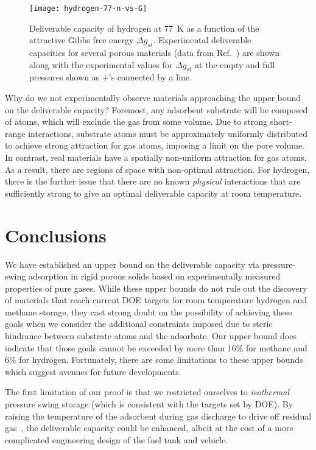 \documentclass[twoside,twocolumn,9pt]{article}
\newcommand\gst{\ensuremath{\Delta g_{st}}}
\begin{document}
\begin{figure}
    \centering
    \texttt{[image: hydrogen-77-n-vs-G]}
    \caption{Deliverable capacity of hydrogen at 77\ K as a function of the attractive Gibbs free energy $\gst$. Experimental deliverable capacities for several porous materials (data from Ref.~\cite{garcia2018benchmark}) are shown along with the experimental values for $\gst$ at the empty and full pressures shown as $+$'s connected by a line.}
    \label{fig:hydrogen-77-D}
\end{figure}

Why do we not experimentally observe materials approaching the upper bound on
the deliverable capacity? Foremost, any adsorbent substrate will be composed of
atoms, which will exclude the gas from some volume. Due to strong short-range
interactions, substrate atoms must be approximately uniformly distributed to achieve strong
attraction for gas atoms, imposing a limit on the pore
volume. In contrast, real materials have a spatially non-uniform attraction for
gas atoms. As a result, there are regions of space with
non-optimal attraction. For hydrogen, there is the further issue that there are
no known \emph{physical} interactions that are sufficiently strong to give an
optimal deliverable capacity at room temperature.

\section{Conclusions}
We have established an upper bound on the deliverable capacity via
pressure-swing adsorption in rigid porous solids based on experimentally
measured properties of pure gases. While these upper bounds do not rule out the
discovery of materials that reach current DOE targets for room temperature hydrogen and methane storage, they cast strong doubt
on the possibility of achieving these goals when we consider the additional
constraints imposed due to steric hindrance between substrate atoms and the
adsorbate. Our upper bound does indicate that those goals cannot be exceeded by
more than 16\% for methane and 6\% for hydrogen. Fortunately, there are some
limitations to these upper bounds which suggest avenues for future developments.

The first limitation of our proof is that we restricted ourselves to
\emph{isothermal} pressure swing storage (which is consistent with the targets set by DOE). By raising the temperature of the
adsorbent during gas discharge to drive off residual
gas~\cite{gomez2014exploring}, the deliverable capacity could be enhanced,
albeit at the cost of a more complicated engineering design of the fuel tank
and vehicle.
\end{document}
